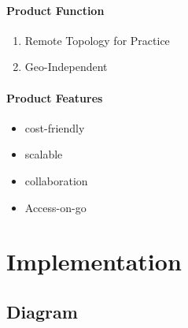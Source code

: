 \documentclass[12pt,a4paper,final,oneside]{report}
\begin{document}
	\subsubsection{Product Function}
	\begin{enumerate}
	\item Remote Topology for Practice
	\item Geo-Independent
	\end{enumerate}
\subsubsection{Product Features}
\begin{itemize}
\item cost-friendly
\item scalable 
\item collaboration
\item Access-on-go
\end{itemize}
\newpage
\chapter{Implementation}
\section{Diagram}
\end{document}
